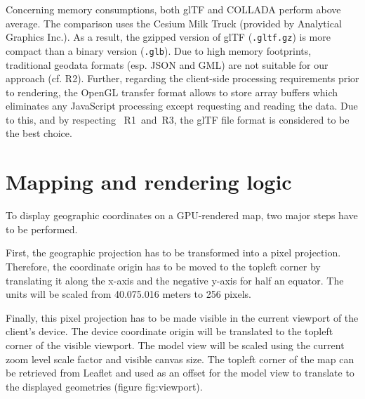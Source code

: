       Concerning memory consumptions, both glTF and COLLADA perform above average. The
      comparison uses the Cesium Milk Truck (provided by Analytical Graphics Inc.). As
      a result, the gzipped version of glTF (\texttt{.gltf.gz}) is more compact than a
      binary version (\texttt{.glb}). Due to high memory footprints, traditional
      geodata formats (esp. JSON and GML) are not suitable for our approach (cf. R2). Further,
      regarding the client-side processing requirements prior to rendering, the OpenGL
      transfer format allows to store array buffers which eliminates any JavaScript
      processing except requesting and reading the data. Due to this, and by respecting~
      R1~and~R3, the glTF file format is considered to be the best choice.

  \section{Mapping and rendering logic}
    \label{sec:conct:rendr}
    To display geographic coordinates on a GPU-rendered map, two major steps have to be performed.\par
    First, the geographic projection has to be transformed into a pixel projection. Therefore, the coordinate origin has to be moved to the topleft corner by translating it along the x-axis and the negative y-axis for half an equator. The units will be scaled from 40.075.016 meters to 256 pixels.


    Finally, this pixel projection has to be made visible in the current viewport of the client's device. The device coordinate origin will be translated to the topleft corner of the visible viewport. The model view will be scaled using the current zoom level scale factor and visible canvas size.  The topleft corner of the map can be retrieved from Leaflet and used as an offset for the model view to translate to the displayed geometries (figure {fig:viewport}).\par
